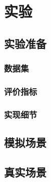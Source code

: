 \section{实验}\label{numerical experiments}

\subsection{实验准备}
\subsubsection{数据集}
\cite{KITTI}
\cite{SemanticKITTI}
\subsubsection{评价指标}
\subsubsection{实现细节}
\subsection{模拟场景}
\subsection{真实场景}


